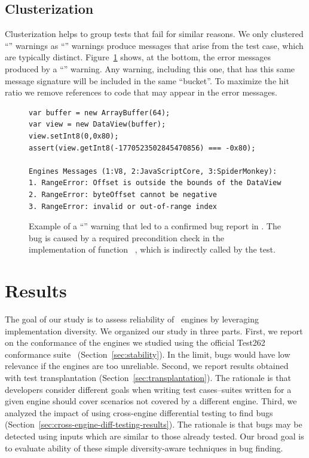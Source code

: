 \documentclass[10pt,conference,anonymous]{IEEEtran}
\begin{document}

\subsection{Clusterization}
\label{sec:clusterization}

Clusterization helps to group tests that fail for similar reasons. We
only clustered ``\lo'' warnings as ``\hi'' warnings produce messages
that arise from the test case, which are typically
distinct. Figure~\ref{fig:lo-truepositive} shows, at the bottom, the
error messages produced by a ``\lo'' warning. Any warning, including
this one, that has this same message signature will be included in the
same ``bucket''. To maximize the hit ratio we remove references to
code that may appear in the error messages.

\begin{figure}[!h]
  \centering
  \begin{lstlisting}
var buffer = new ArrayBuffer(64);
var view = new DataView(buffer);
view.setInt8(0,0x80);
assert(view.getInt8(-1770523502845470856) === -0x80);

Engines Messages (1:V8, 2:JavaScriptCore, 3:SpiderMonkey):
1. RangeError: Offset is outside the bounds of the DataView
2. RangeError: byteOffset cannot be negative
3. RangeError: invalid or out-of-range index
  \end{lstlisting}
  \caption{\label{fig:lo-truepositive}Example of a ``\lo'' warning
    that led to a confirmed bug report in \chakra. The bug is caused
    by a required precondition check in the implementation of function
    ~\cite{ecmas262-getviewvalue}, which is indirectly called by the test. }
\end{figure}

\section{Results}
\label{sec:results}

The goal of our study is to assess reliability of \js\ engines by
leveraging implementation diversity. We organized our study in three
parts. First, we report on the conformance of the engines we studied
using the official Test262 conformance
suite~\cite{ecma262-conformance-suite}
(Section~\ref{sec:stability}). In the limit, bugs would have low
relevance if the engines are too unreliable. Second, we report results
obtained with test transplantation
(Section~\ref{sec:transplantation}). The rationale is that developers
consider different goals when writing test cases--suites written for a
given engine should cover scenarios not covered by a different
engine. Third, we analyzed the impact of using cross-engine
differential testing to find bugs
(Section~\ref{sec:cross-engine-diff-testing-results}). The rationale
is that bugs may be detected using inputs which are similar to those
already tested. Our broad goal is to evaluate ability of these simple
diversity-aware techniques in bug finding.
\end{document}
